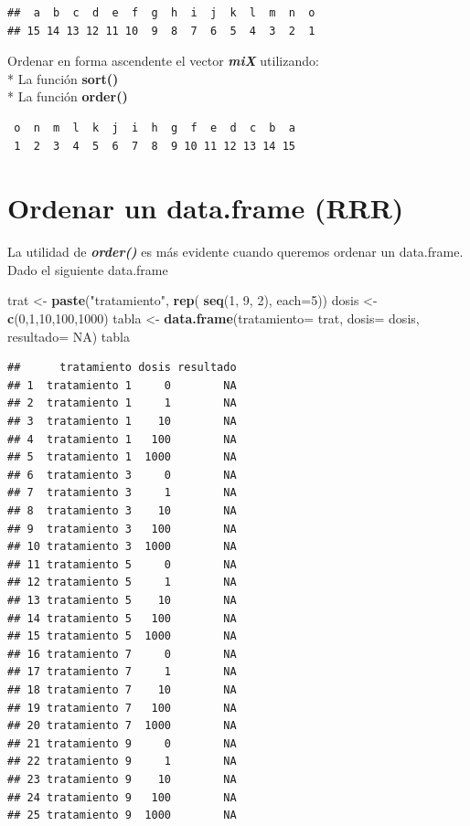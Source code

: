 \documentclass[]{book}
\newenvironment{Shaded}{\begin{snugshade}}{\end{snugshade}}
\newcommand{\DataTypeTok}[1]{\textcolor[rgb]{0.13,0.29,0.53}{#1}}
\newcommand{\DecValTok}[1]{\textcolor[rgb]{0.00,0.00,0.81}{#1}}
\newcommand{\KeywordTok}[1]{\textcolor[rgb]{0.13,0.29,0.53}{\textbf{#1}}}
\newcommand{\NormalTok}[1]{#1}
\newcommand{\OtherTok}[1]{\textcolor[rgb]{0.56,0.35,0.01}{#1}}
\newcommand{\StringTok}[1]{\textcolor[rgb]{0.31,0.60,0.02}{#1}}
\begin{document}
\begin{verbatim}
##  a  b  c  d  e  f  g  h  i  j  k  l  m  n  o 
## 15 14 13 12 11 10  9  8  7  6  5  4  3  2  1
\end{verbatim}

Ordenar en forma ascendente el vector \textbf{\emph{miX}} utilizando:\\
* La función \textbf{sort()}\\
* La función \textbf{order()}

\begin{verbatim}
 o  n  m  l  k  j  i  h  g  f  e  d  c  b  a 
 1  2  3  4  5  6  7  8  9 10 11 12 13 14 15 
\end{verbatim}

\hypertarget{ordenar-un-data.frame-rrr}{%
\section{Ordenar un data.frame (RRR)}\label{ordenar-un-data.frame-rrr}}

La utilidad de \emph{\textbf{order()}} es más evidente cuando queremos ordenar un data.frame.
Dado el siguiente data.frame

\begin{Shaded}
\begin{Highlighting}[]
\NormalTok{trat <-}\StringTok{ }\KeywordTok{paste}\NormalTok{(}\StringTok{"tratamiento"}\NormalTok{, }\KeywordTok{rep}\NormalTok{( }\KeywordTok{seq}\NormalTok{(}\DecValTok{1}\NormalTok{, }\DecValTok{9}\NormalTok{, }\DecValTok{2}\NormalTok{), }\DataTypeTok{each=}\DecValTok{5}\NormalTok{))}
\NormalTok{dosis <-}\StringTok{ }\KeywordTok{c}\NormalTok{(}\DecValTok{0}\NormalTok{,}\DecValTok{1}\NormalTok{,}\DecValTok{10}\NormalTok{,}\DecValTok{100}\NormalTok{,}\DecValTok{1000}\NormalTok{)}
\NormalTok{tabla <-}\StringTok{ }\KeywordTok{data.frame}\NormalTok{(}\DataTypeTok{tratamiento=}\NormalTok{ trat, }\DataTypeTok{dosis=}\NormalTok{ dosis, }\DataTypeTok{resultado=} \OtherTok{NA}\NormalTok{)}
\NormalTok{tabla}
\end{Highlighting}
\end{Shaded}

\begin{verbatim}
##      tratamiento dosis resultado
## 1  tratamiento 1     0        NA
## 2  tratamiento 1     1        NA
## 3  tratamiento 1    10        NA
## 4  tratamiento 1   100        NA
## 5  tratamiento 1  1000        NA
## 6  tratamiento 3     0        NA
## 7  tratamiento 3     1        NA
## 8  tratamiento 3    10        NA
## 9  tratamiento 3   100        NA
## 10 tratamiento 3  1000        NA
## 11 tratamiento 5     0        NA
## 12 tratamiento 5     1        NA
## 13 tratamiento 5    10        NA
## 14 tratamiento 5   100        NA
## 15 tratamiento 5  1000        NA
## 16 tratamiento 7     0        NA
## 17 tratamiento 7     1        NA
## 18 tratamiento 7    10        NA
## 19 tratamiento 7   100        NA
## 20 tratamiento 7  1000        NA
## 21 tratamiento 9     0        NA
## 22 tratamiento 9     1        NA
## 23 tratamiento 9    10        NA
## 24 tratamiento 9   100        NA
## 25 tratamiento 9  1000        NA
\end{verbatim}
\end{document}
